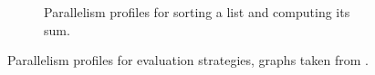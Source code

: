 \begin{figure}[H]
{\begin{minipage}[c]{1.2\textwidth}
\begin{subfigure}{.45\textwidth}
  \caption{Parallelism profiles for sorting a list and computing its sum.}
  \label{fig:eval-para-2}%
\end{subfigure}%
\end{minipage}}
\caption{Parallelism profiles for evaluation strategies, graphs taken from \cite{DBLP:journals/cl/Tremblay-parallel}.}%
\label{fig:eval-para}%
\end{figure}%
